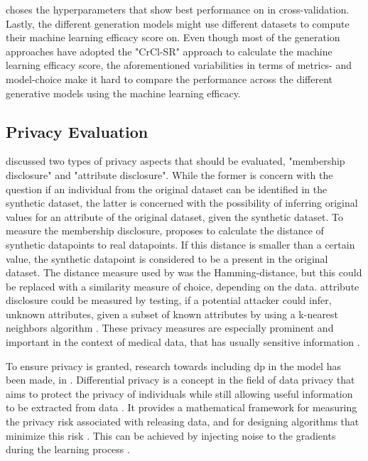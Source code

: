 \cite{kim2021OCTGANNeuralODEbased} choses the hyperparameters that show best performance on in cross-validation.
Lastly, the different generation models might use different datasets to compute their machine learning efficacy score on.
Even though most of the generation approaches have adopted the "CrCl-SR"\cite{goncalves2020GenerationEvaluationSynthetic} approach to calculate the machine learning efficacy score,
the aforementioned variabilities in terms of metrics- and model-choice make it hard to compare the performance across the different generative models using the machine learning efficacy.


\subsection{Privacy Evaluation}
\label{ch:preliminaries-evaluationOfSyntheticTabularData-privacyEvaluation}
\cite{goncalves2020GenerationEvaluationSynthetic} discussed two types of privacy aspects that should be evaluated, "membership disclosure" and "attribute disclosure".
While the former is concern with the question if an individual from the original dataset can be identified in the synthetic dataset, the latter is concerned with the possibility of inferring original values for an attribute of the original dataset, given the synthetic dataset.
To measure the membership disclosure, \cite{goncalves2020GenerationEvaluationSynthetic} proposes to calculate the distance of synthetic datapoints to real datapoints.
If this distance is smaller than a certain value, the synthetic datapoint is considered to be a present in the original dataset.
The distance measure used by \cite{goncalves2020GenerationEvaluationSynthetic} was the Hamming-distance, but this could be replaced with a similarity measure of choice, depending on the data.
attribute disclosure could be measured by testing, if a potential attacker could infer, unknown attributes, given a subset of known attributes by using a k-nearest neighbors algorithm \cite{goncalves2020GenerationEvaluationSynthetic}.
These privacy measures are especially prominent and important in the context of medical data, that has usually sensitive information \cite{goncalves2020GenerationEvaluationSynthetic, pmlr-v68-choi17a}.

To ensure privacy is granted, research towards including \gls{dp}\cite{dwork2008DifferentialPrivacySurvey} in the model has been made, \eg in \cite{xie2018DifferentiallyPrivateGenerative, jordon2018PATEGANGeneratingSynthetic, torfi2022DifferentiallyPrivateSynthetic}.
Differential privacy is a concept in the field of data privacy that aims to protect the privacy of individuals while still allowing useful information to be extracted from data \cite{dwork2008DifferentialPrivacySurvey}. 
It provides a mathematical framework for measuring the privacy risk associated with releasing data, and for designing algorithms that minimize this risk \cite{dwork2008DifferentialPrivacySurvey, zhao2022CTABGANEnhancingTabular}.
This can be achieved by injecting noise to the gradients during the learning process \cite{xie2018DifferentiallyPrivateGenerative}.

